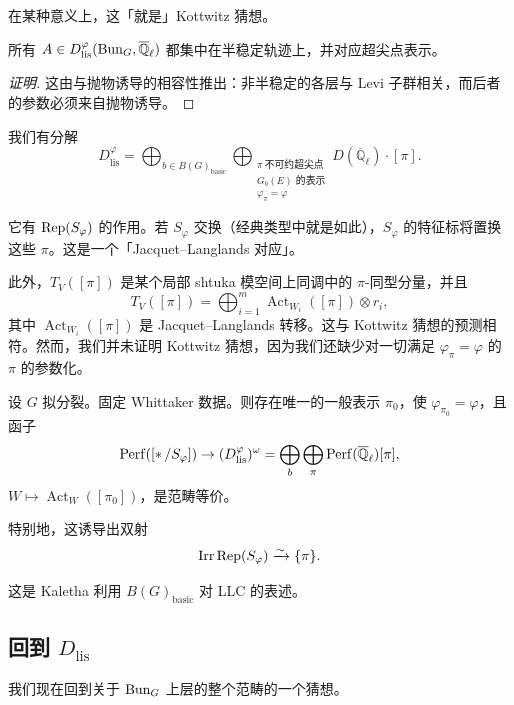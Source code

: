 在某种意义上，这「就是」Kottwitz 猜想。

\begin{proposition}
所有 $A\in D^\varphi_{\mathrm{lis}}(\mathrm{Bun}_G,\overline{\mathbb Q}_\ell)$ 都集中在半稳定轨迹上，并对应超尖点表示。
\end{proposition}

\begin{proof}[证明]
这由与抛物诱导的相容性推出：非半稳定的各层与 Levi 子群相关，而后者的参数必须来自抛物诱导。
\end{proof}

我们有分解
\[
D^\varphi_{\mathrm{lis}}=\bigoplus_{b\in B(G)_{\mathrm{basic}}}\bigoplus_{\substack{\pi\ \text{不可约超尖点}\\\text{$G_b(E)$ 的表示}\\\varphi_\pi=\varphi}}D(\overline{\mathbb Q}_\ell)\cdot[\pi].
\]

它有 $\operatorname{Rep}(S_\varphi)$ 的作用。若 $S_\varphi$ 交换（经典类型中就是如此），$S_\varphi$ 的特征标将置换这些 $\pi$。这是一个「Jacquet--Langlands 对应」。

此外，$T_V([\pi])$ 是某个局部 shtuka 模空间上同调中的 $\pi$-同型分量，并且
\[
T_V([\pi])=\bigoplus_{i=1}^{m}\operatorname{Act}_{W_i}([\pi])\otimes r_i,
\]
其中 $\operatorname{Act}_{W_i}([\pi])$ 是 Jacquet--Langlands 转移。这与 Kottwitz 猜想的预测相符。然而，我们并未证明 Kottwitz 猜想，因为我们还缺少对一切满足 $\varphi_\pi=\varphi$ 的 $\pi$ 的参数化。

\begin{conjecture}
设 $G$ 拟分裂。固定 Whittaker 数据。则存在唯一的一般表示 $\pi_0$，使 $\varphi_{\pi_0}=\varphi$，且函子
\[
\mathrm{Perf}([*\,/S_\varphi])\to(D^\varphi_{\mathrm{lis}})^\omega=\bigoplus_b\bigoplus_\pi\mathrm{Perf}(\overline{\mathbb Q}_\ell)[\pi],
\]
$W\mapsto\operatorname{Act}_W([\pi_0])$，是范畴等价。
\end{conjecture}

特别地，这诱导出双射
\[
\operatorname{Irr}\operatorname{Rep}(S_\varphi)\xrightarrow{\sim}\{\pi\}.
\]

\begin{remark}
这是 Kaletha 利用 $B(G)_{\mathrm{basic}}$ 对 LLC 的表述。
\end{remark}


\subsection{回到 $D_{\mathrm{lis}}$}

我们现在回到关于 $\mathrm{Bun}_G$ 上层的整个范畴的一个猜想。


